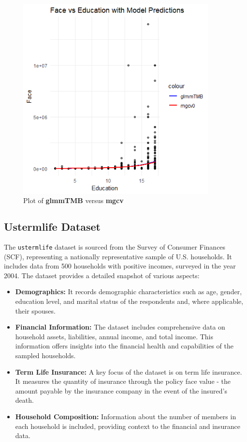 \documentclass[12pt, twoside,hidelinks]{article}
\theoremstyle{definition}
\numberwithin{equation}{section}
\begin{document}
\newpage
\begin{figure}[H]
    \centering
    \includegraphics[width=0.9\textwidth]{visuals/InsuranceVisuals/FacevEducation.png}
    \caption{Plot of \textbf{glmmTMB} versus \textbf{mgcv}}
    \label{fig:FaceVseducation}
\end{figure}






\subsection{Ustermlife Dataset}
The \texttt{ustermlife} dataset is sourced from the Survey of Consumer Finances (SCF), representing a nationally representative sample of U.S. households. It includes data from 500 households with positive incomes, surveyed in the year 2004. The dataset provides a detailed snapshot of various aspects:

\begin{itemize}
    \item \textbf{Demographics:} It records demographic characteristics such as age, gender, education level, and marital status of the respondents and, where applicable, their spouses.
    \item \textbf{Financial Information:} The dataset includes comprehensive data on household assets, liabilities, annual income, and total income. This information offers insights into the financial health and capabilities of the sampled households.
    \item \textbf{Term Life Insurance:} A key focus of the dataset is on term life insurance. It measures the quantity of insurance through the policy face value - the amount payable by the insurance company in the event of the insured's death.
    \item \textbf{Household Composition:} Information about the number of members in each household is included, providing context to the financial and insurance data.
\end{itemize}
\end{document}
